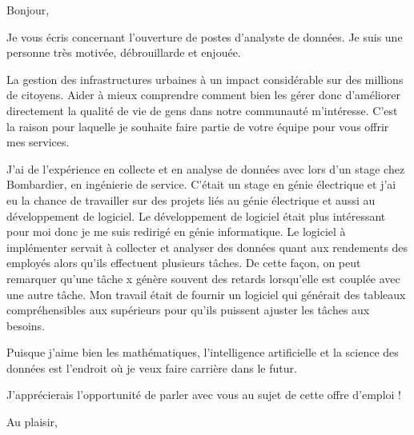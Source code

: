\documentclass[12pt,french]{letter}
\begin{document}
\pagestyle{headings}

\begin{letter}{}
\address{Montréal, Canada}

\opening{Bonjour,}


Je vous écris concernant l'ouverture de postes d’analyste de données.
Je suis une personne très motivée, débrouillarde et enjouée. 

La gestion des infrastructures urbaines à un impact considérable sur des millions de citoyens. Aider à mieux comprendre comment bien les gérer donc d'améliorer directement la qualité de vie de gens dans notre communauté m'intéresse.  C'est la raison pour laquelle je souhaite faire partie de votre équipe pour vous offrir mes services.

J'ai de l'expérience en collecte et en analyse de données avec lors d'un stage chez Bombardier, en ingénierie de service. C'était un stage en génie électrique et j'ai eu la chance de travailler sur des projets liés au génie électrique et aussi au développement de logiciel. Le développement de logiciel était plus intéressant pour moi donc je me suis redirigé en génie informatique. Le logiciel à implémenter servait à collecter et analyser des données quant aux rendements des employés alors qu'ils effectuent plusieurs tâches. De cette façon, on peut remarquer qu'une tâche x génère souvent des retards lorsqu'elle est couplée avec une autre tâche. Mon travail était de fournir un logiciel qui générait des tableaux compréhensibles aux supérieurs pour qu'ils puissent ajuster les tâches aux besoins. 

Puisque j'aime bien les mathématiques, l'intelligence artificielle et la science des données est l'endroit où je veux faire carrière dans le futur.

J'apprécierais l'opportunité de parler avec vous au sujet de cette offre d'emploi !

\signature{Maxime}

\closing{Au plaisir,}


\end{letter}
\end{document}

